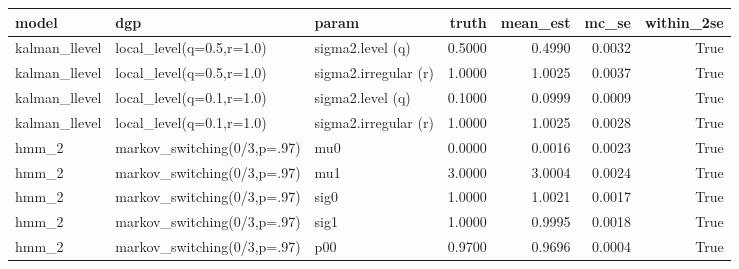 \begin{tabular}{lllrrrr}
\toprule
model & dgp & param & truth & mean_est & mc_se & within_2se \\
\midrule
kalman_llevel & local_level(q=0.5,r=1.0) & sigma2.level (q) & 0.5000 & 0.4990 & 0.0032 & True \\
kalman_llevel & local_level(q=0.5,r=1.0) & sigma2.irregular (r) & 1.0000 & 1.0025 & 0.0037 & True \\
kalman_llevel & local_level(q=0.1,r=1.0) & sigma2.level (q) & 0.1000 & 0.0999 & 0.0009 & True \\
kalman_llevel & local_level(q=0.1,r=1.0) & sigma2.irregular (r) & 1.0000 & 1.0025 & 0.0028 & True \\
hmm_2 & markov_switching(0/3,p=.97) & mu0 & 0.0000 & 0.0016 & 0.0023 & True \\
hmm_2 & markov_switching(0/3,p=.97) & mu1 & 3.0000 & 3.0004 & 0.0024 & True \\
hmm_2 & markov_switching(0/3,p=.97) & sig0 & 1.0000 & 1.0021 & 0.0017 & True \\
hmm_2 & markov_switching(0/3,p=.97) & sig1 & 1.0000 & 0.9995 & 0.0018 & True \\
hmm_2 & markov_switching(0/3,p=.97) & p00 & 0.9700 & 0.9696 & 0.0004 & True \\
\bottomrule
\end{tabular}
